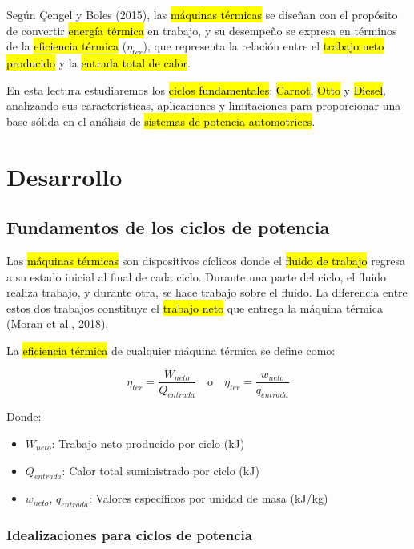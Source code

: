 \documentclass{article}
\begin{document}
    Según Çengel y Boles (2015), las \hl{máquinas térmicas} se diseñan con el propósito de convertir \hl{energía térmica} en trabajo, y su desempeño se expresa en términos de la \hl{eficiencia térmica} ($\eta_{ter}$), que representa la relación entre el \hl{trabajo neto producido} y la \hl{entrada total de calor}.

    En esta lectura estudiaremos los \hl{ciclos fundamentales}: \hl{Carnot}, \hl{Otto} y \hl{Diesel}, analizando sus características, aplicaciones y limitaciones para proporcionar una base sólida en el análisis de \hl{sistemas de potencia automotrices}.

    \section{Desarrollo}

    \subsection{Fundamentos de los ciclos de potencia}

    Las \hl{máquinas térmicas} son dispositivos cíclicos donde el \hl{fluido de trabajo} regresa a su estado inicial al final de cada ciclo. Durante una parte del ciclo, el fluido realiza trabajo, y durante otra, se hace trabajo sobre el fluido. La diferencia entre estos dos trabajos constituye el \hl{trabajo neto} que entrega la máquina térmica (Moran et al., 2018).

    La \hl{eficiencia térmica} de cualquier máquina térmica se define como:

    \begin{equation}
    \eta_{ter} = \frac{W_{neto}}{Q_{entrada}} \quad \text{o} \quad \eta_{ter} = \frac{w_{neto}}{q_{entrada}}
    \end{equation}

    Donde:
    \begin{itemize}
        \item $W_{neto}$: Trabajo neto producido por ciclo (kJ)
        \item $Q_{entrada}$: Calor total suministrado por ciclo (kJ)
        \item $w_{neto}$, $q_{entrada}$: Valores específicos por unidad de masa (kJ/kg)
    \end{itemize}

    \subsubsection{Idealizaciones para ciclos de potencia}
\end{document}
